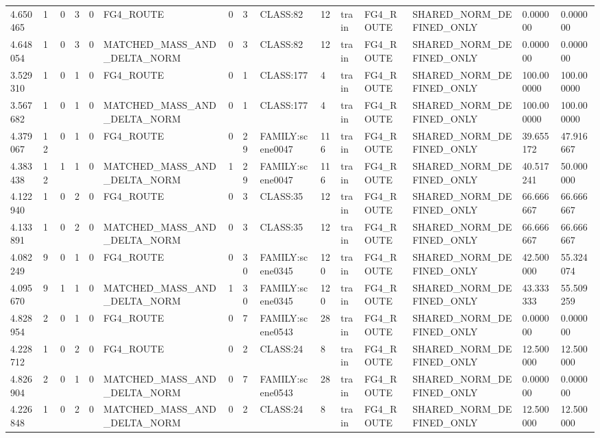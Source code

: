 \begin{tabular}{lllllllllllllll}
4.650465 & 1 & 0 & 3 & 0 & FG4\_ROUTE & 0 & 3 & CLASS:82 & 12 & train & FG4\_ROUTE & SHARED\_NORM\_DEFINED\_ONLY & 0.000000 & 0.000000 \\
4.648054 & 1 & 0 & 3 & 0 & MATCHED\_MASS\_AND\_DELTA\_NORM & 0 & 3 & CLASS:82 & 12 & train & FG4\_ROUTE & SHARED\_NORM\_DEFINED\_ONLY & 0.000000 & 0.000000 \\
3.529310 & 1 & 0 & 1 & 0 & FG4\_ROUTE & 0 & 1 & CLASS:177 & 4 & train & FG4\_ROUTE & SHARED\_NORM\_DEFINED\_ONLY & 100.000000 & 100.000000 \\
3.567682 & 1 & 0 & 1 & 0 & MATCHED\_MASS\_AND\_DELTA\_NORM & 0 & 1 & CLASS:177 & 4 & train & FG4\_ROUTE & SHARED\_NORM\_DEFINED\_ONLY & 100.000000 & 100.000000 \\
4.379067 & 12 & 0 & 1 & 0 & FG4\_ROUTE & 0 & 29 & FAMILY:scene0047 & 116 & train & FG4\_ROUTE & SHARED\_NORM\_DEFINED\_ONLY & 39.655172 & 47.916667 \\
4.383438 & 12 & 1 & 1 & 0 & MATCHED\_MASS\_AND\_DELTA\_NORM & 1 & 29 & FAMILY:scene0047 & 116 & train & FG4\_ROUTE & SHARED\_NORM\_DEFINED\_ONLY & 40.517241 & 50.000000 \\
4.122940 & 1 & 0 & 2 & 0 & FG4\_ROUTE & 0 & 3 & CLASS:35 & 12 & train & FG4\_ROUTE & SHARED\_NORM\_DEFINED\_ONLY & 66.666667 & 66.666667 \\
4.133891 & 1 & 0 & 2 & 0 & MATCHED\_MASS\_AND\_DELTA\_NORM & 0 & 3 & CLASS:35 & 12 & train & FG4\_ROUTE & SHARED\_NORM\_DEFINED\_ONLY & 66.666667 & 66.666667 \\
4.082249 & 9 & 0 & 1 & 0 & FG4\_ROUTE & 0 & 30 & FAMILY:scene0345 & 120 & train & FG4\_ROUTE & SHARED\_NORM\_DEFINED\_ONLY & 42.500000 & 55.324074 \\
4.095670 & 9 & 1 & 1 & 0 & MATCHED\_MASS\_AND\_DELTA\_NORM & 1 & 30 & FAMILY:scene0345 & 120 & train & FG4\_ROUTE & SHARED\_NORM\_DEFINED\_ONLY & 43.333333 & 55.509259 \\
4.828954 & 2 & 0 & 1 & 0 & FG4\_ROUTE & 0 & 7 & FAMILY:scene0543 & 28 & train & FG4\_ROUTE & SHARED\_NORM\_DEFINED\_ONLY & 0.000000 & 0.000000 \\
4.228712 & 1 & 0 & 2 & 0 & FG4\_ROUTE & 0 & 2 & CLASS:24 & 8 & train & FG4\_ROUTE & SHARED\_NORM\_DEFINED\_ONLY & 12.500000 & 12.500000 \\
4.826904 & 2 & 0 & 1 & 0 & MATCHED\_MASS\_AND\_DELTA\_NORM & 0 & 7 & FAMILY:scene0543 & 28 & train & FG4\_ROUTE & SHARED\_NORM\_DEFINED\_ONLY & 0.000000 & 0.000000 \\
4.226848 & 1 & 0 & 2 & 0 & MATCHED\_MASS\_AND\_DELTA\_NORM & 0 & 2 & CLASS:24 & 8 & train & FG4\_ROUTE & SHARED\_NORM\_DEFINED\_ONLY & 12.500000 & 12.500000 \\

\end{tabular}
